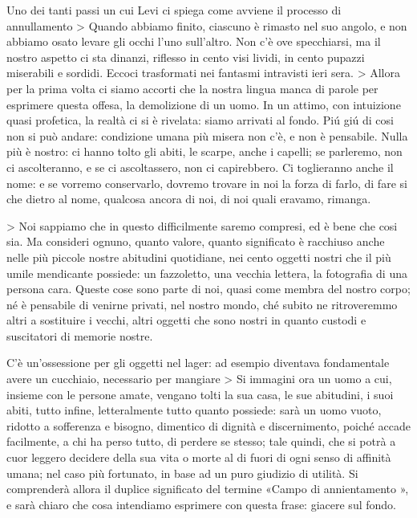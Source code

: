 Uno dei tanti passi un cui Levi ci spiega come avviene il processo di annullamento
> Quando abbiamo finito, ciascuno è rimasto nel suo angolo, e non abbiamo osato levare gli occhi l'uno sull'altro. Non c'è ove specchiarsi, ma il nostro aspetto ci sta dinanzi, riflesso in cento visi lividi, in cento pupazzi miserabili e sordidi. Eccoci trasformati nei fantasmi intravisti ieri sera.
> Allora per la prima volta ci siamo accorti che la nostra lingua manca di parole per esprimere questa offesa, la demolizione di un uomo. In un attimo, con intuizione quasi profetica, la realtà ci si è rivelata: siamo arrivati al fondo. Piú giú di cosi non si può andare: condizione umana più misera non c'è, e non è pensabile. Nulla più è nostro: ci hanno tolto gli abiti, le scarpe, anche i capelli; se parleremo, non ci ascolteranno, e se ci ascoltassero, non ci capirebbero. Ci toglieranno anche il nome: e se vorremo conservarlo, dovremo trovare in noi la forza di farlo, di fare si che dietro al nome, qualcosa ancora di noi, di noi quali eravamo, rimanga.

> Noi sappiamo che in questo difficilmente saremo compresi, ed è bene che cosi sia. Ma consideri ognuno, quanto valore, quanto significato è racchiuso anche nelle più piccole nostre abitudini quotidiane, nei cento oggetti nostri che il più umile mendicante possiede: un fazzoletto, una vecchia lettera, la fotografia di una persona cara. Queste cose sono parte di noi, quasi come membra del nostro corpo; né è pensabile di venirne privati, nel nostro mondo, ché subito ne ritroveremmo altri a sostituire i vecchi, altri oggetti che sono nostri in quanto custodi e suscitatori di memorie nostre.

C'è un'ossessione per gli oggetti nel lager: ad esempio diventava fondamentale avere un cucchiaio, necessario per mangiare
> Si immagini ora un uomo a cui, insieme con le persone amate, vengano tolti la sua casa, le sue abitudini, i suoi abiti, tutto infine, letteralmente tutto quanto possiede: sarà un uomo vuoto, ridotto a sofferenza e bisogno, dimentico di dignità e discernimento, poiché accade facilmente, a chi ha perso tutto, di perdere se stesso; tale quindi, che si potrà a cuor leggero decidere della sua vita o morte al di fuori di ogni senso di affinità umana; nel caso più fortunato, in base ad un puro giudizio di utilità. Si comprenderà allora il duplice significato del termine «Campo di annientamento », e sarà chiaro che cosa intendiamo esprimere con questa frase: giacere sul fondo.

